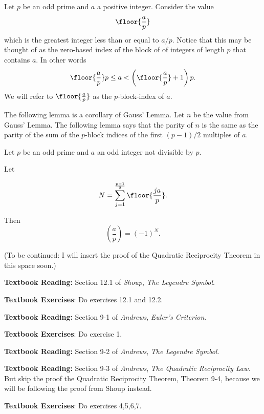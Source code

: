 \documentclass[oneside,12pt]{amsart}
\begin{document}
Let $p$ be an odd prime and $a$ a positive integer. Consider the value
$$\floor{\frac{a}{p}}$$
which is the greatest integer less than or equal to $a/p$. Notice that this may be
thought of as the zero-based index of the block of of integers of length $p$ that contains $a$. 
In other words
$$\floor{\frac{a}{p}}p \leq a < \left(\floor{\frac{a}{p}} + 1\right)p.$$
We will refer to $\floor{\frac{a}{p}}$ as the $p$-block-index of $a$.

The following lemma is a corollary of Gauss' Lemma. Let $n$ be the value from
Gauss' Lemma. The following lemma says that the parity of $n$ is the same as the
parity of the sum of the $p$-block indices of the first $(p-1)/2$ multiples of $a$.

\begin{lemma}
Let $p$ be an odd prime and $a$ an odd integer not divisible by $p$.

Let

$$N=\sum_{j=1}^{\frac{p-1}{2}}\floor{\frac{ja}{p}}.$$

Then $$\left(\frac{a}{p} \right) = (-1)^N.$$

\end{lemma}

(To be continued: I will insert the proof of the Quadratic Reciprocity Theorem
in this space soon.)


\bigskip

\textbf{Textbook Reading:} Section 12.1 of \emph{Shoup}, \emph{The Legendre Symbol}.

\textbf{Textbook Exercises}: Do exercises 12.1 and 12.2.

\bigskip

\textbf{Textbook Reading:} Section 9-1 of \emph{Andrews}, \emph{Euler's Criterion}.

\textbf{Textbook Exercises}: Do exercise 1.

\bigskip

\textbf{Textbook Reading:} Section 9-2 of \emph{Andrews}, \emph{The Legendre Symbol}.

\bigskip

\textbf{Textbook Reading:} Section 9-3 of \emph{Andrews}, \emph{The Quadratic Reciprocity Law}.
But skip the proof the Quadratic Reciprocity Theorem, Theorem 9-4, because we will be following
the proof from Shoup instead.

\textbf{Textbook Exercises}: Do exercises 4,5,6,7.




\end{document}
